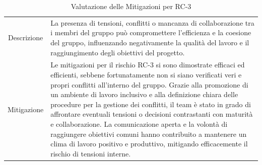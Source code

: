 \documentclass[5pt]{article}
\begin{document}
\begin{table}[H]
    \centering
    \begin{tabular}{|c|p{10cm}|}
        \hline
        \rowcolor{teal!50}
        \multicolumn{2}{|c|}{\textbf{RC-3: Tensioni e conflitti interni}} \\ 
        \hline
        Descrizione & La presenza di tensioni, conflitti o mancanza di collaborazione tra i membri del gruppo può compromettere l'efficienza e la coesione del gruppo, influenzando negativamente la qualità del lavoro e il raggiungimento degli obiettivi del progetto. \\ \hline
        Mitigazione & Le mitigazioni per il rischio RC-3 si sono dimostrate efficaci ed efficienti, sebbene fortunatamente non si siano verificati veri e propri conflitti all'interno del gruppo. Grazie alla promozione di un ambiente di lavoro inclusivo e alla definizione chiara delle procedure per la gestione dei conflitti, il team è stato in grado di affrontare eventuali tensioni o decisioni contrastanti con maturità e collaborazione. La comunicazione aperta e la volontà di raggiungere obiettivi comuni hanno contribuito a mantenere un clima di lavoro positivo e produttivo, mitigando efficacemente il rischio di tensioni interne. \\ \hline
    \end{tabular}
    \caption{Valutazione delle Mitigazioni per RC-3}
\end{table}
\end{document}
